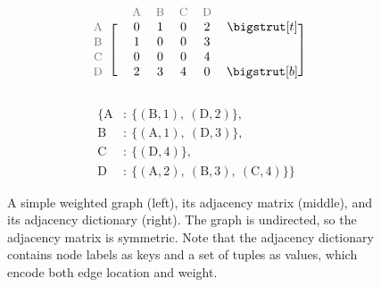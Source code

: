 \begin{figure}[H] %
\captionsetup[subfigure]{justification=centering}
\centering
\begin{subfigure}{.32\textwidth}
\centering
{}
\end{subfigure}
%
\begin{subfigure}{.32\textwidth}
\centering
\begin{align*}
    \begin{blockarray}{ccccccc}
    & & \small\text{\textcolor{gray}{A}} & \small\text{\textcolor{gray}{B}} & \small\text{\textcolor{gray}{C}} & \small\text{\textcolor{gray}{D}} & \\
    \begin{block}{c[cccccc]}
    \small\text{\textcolor{gray}{A}} & & 0 & 1 & 0 & 2 & \topstrut\\
    \small\text{\textcolor{gray}{B}} & & 1 & 0 & 0 & 3 & \\
    \small\text{\textcolor{gray}{C}} & & 0 & 0 & 0 & 4 & \\
    \small\text{\textcolor{gray}{D}} & & 2 & 3 & 4 & 0 & \botstrut\\
    \end{block}\end{blockarray}
\end{align*}
\end{subfigure}
%
\begin{subfigure}{.32\textwidth}
\centering
\begin{align*}
    \{\text{A}&:\ \{(\text{B}, 1),\ (\text{D}, 2)\},\\
    \text{B}&:\ \{(\text{A}, 1),\ (\text{D}, 3)\},\\
    \text{C}&:\ \{(\text{D}, 4)\},\\
    \text{D}&:\ \{(\text{A}, 2),\ (\text{B}, 3),\ (\text{C}, 4)\}\}
\end{align*}
\end{subfigure}
\caption{A simple weighted graph (left), its adjacency matrix (middle), and its adjacency dictionary (right).
The graph is undirected, so the adjacency matrix is symmetric.
Note that the adjacency dictionary contains node labels as keys and a set of tuples as values, which encode both edge location and weight.}
\label{fig:simple-graph}
\end{figure}

